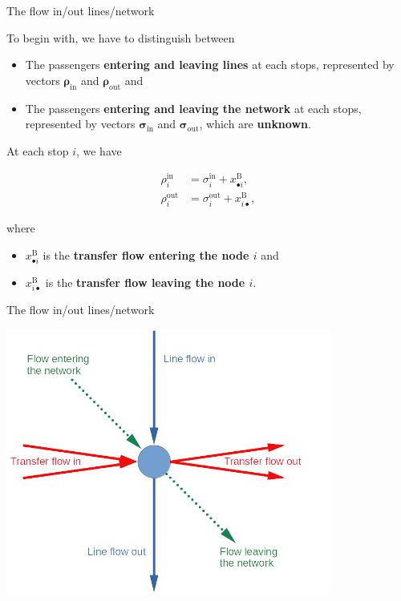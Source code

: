 \documentclass[10pt]{beamer}
\newcommand{\imp}[1]{\textbf{\color{cyan}#1}}
\begin{document}
	
	\begin{frame}{The flow in/out lines/network}
		
		To begin with, we have to distinguish between
		
		\begin{itemize}
			\item The passengers \imp{entering and leaving lines} at each stops, represented by vectors \imp{$\bm{\rho}_\text{in}$} and \imp{$\bm{\rho}_\text{out}$} and 
			\item The passengers \imp{entering and leaving the network} at each stops, represented by vectors \imp{$\bm{\sigma}_\text{in}$} and \imp{$\bm{\sigma}_\text{out}$}, which are \imp{unknown}.
		\end{itemize}
	
		At each stop $i$, we have 
		
		\begin{align*}
			\rho^\text{in}_i &= \sigma^\text{in}_i + x^\text{B}_{\bullet i}, \\
			\rho^\text{out}_i &= \sigma^\text{out}_i + x^\text{B}_{i \bullet},
		\end{align*}
		
		where 
		\begin{itemize}
			\item $x^\text{B}_{\bullet i}$ is the \imp{transfer flow entering the node $i$} and
			\item $x^\text{B}_{i \bullet}$ is the \imp{transfer flow leaving the node $i$}.
		\end{itemize}
	\end{frame}
	
	
	\begin{frame}{The flow in/out lines/network}
		\begin{center}
			\hspace{0.1cm} \includegraphics[width=0.8\textwidth]{img/flow_balance.png}
		\end{center}
	\end{frame}
	
\end{document}
